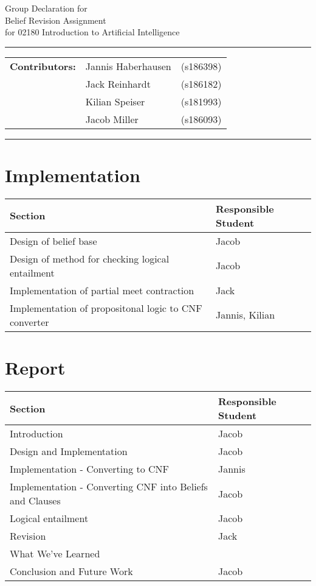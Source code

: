 \documentclass[a4paper,10pt]{article}
\begin{document}
\begin{center}
Group Declaration for\\
\vspace{0.5cm}
{{\Large \sc Belief Revision Assignment}}\\
\vspace{0.5cm} for 02180 Introduction to Artificial Intelligence
\end{center}
\rule{\textwidth}{0.5pt}
\begin{description}
\item\begin{tabular}{rll}
    \textbf{Contributors:}& Jannis Haberhausen &(s186398)\\ & Jack Reinhardt &(s186182)\\ & Kilian Speiser &(s181993)\\ & Jacob Miller &(s186093) \\
\end{tabular}
\end{description}
\rule{\textwidth}{1pt}


\section*{\large{Implementation}}
\begin{table}[!ht]
\centering
\begin{tabular}{l|l} \hline
    \textbf{Section} & \textbf{Responsible Student} \\ \hline
    Design of belief base                               & Jacob \\
    Design of method for checking logical entailment    & Jacob \\
    Implementation of partial meet contraction          & Jack \\
    Implementation of propositonal logic to CNF converter & Jannis, Kilian \\
\end{tabular}
\end{table}

\section*{\large{Report}}
\begin{table}[!ht]
\centering
\begin{tabular}{l|l} \hline
    \textbf{Section} & \textbf{Responsible Student} \\ \hline
    Introduction                        & Jacob \\
    Design and Implementation           & Jacob \\
    Implementation - Converting to CNF  & Jannis \\
    Implementation - Converting CNF into Beliefs and Clauses & Jacob \\
    Logical entailment                  & Jacob \\
    Revision                            & Jack \\
    What We've Learned                  & \\
    Conclusion and Future Work          & Jacob \\
\end{tabular}
\end{table}
\end{document}
